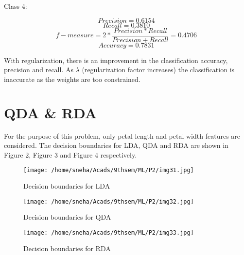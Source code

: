 \documentclass[12pt]{article}
\begin{document}
\begin{itemize}
{Class 4:

\begin{equation}
Precision = 0.6154
\end{equation}
\begin{equation}
Recall = 0.3810
\end{equation}
\begin{equation}
f-measure = 2*\frac{Precision*Recall}{Precision + Recall} = 0.4706
\end{equation}
\begin{equation}
Accuracy = 0.7831
\end{equation}


With regularization, there is an improvement in the classification accuracy, precision and recall. As $\lambda$ (regularization factor increases) the classification is inaccurate as the weights are too constrained.
}




\end{itemize}




\section{QDA \& RDA}

For the purpose of this problem, only petal length and petal width features are considered. The decision boundaries for LDA, QDA and RDA are shown in Figure 2, Figure 3 and Figure 4 respectively.


\begin{figure}


	\centering
		\texttt{[image: /home/sneha/Acads/9thsem/ML/P2/img31.jpg]}
	\caption{Decision boundaries for LDA}
	
\end{figure}


\begin{figure}
	\centering
		\texttt{[image: /home/sneha/Acads/9thsem/ML/P2/img32.jpg]}
	\caption{Decision boundaries for QDA}
	
\end{figure}

\begin{figure}
	\centering
		\texttt{[image: /home/sneha/Acads/9thsem/ML/P2/img33.jpg]}
	\caption{Decision boundaries for RDA}
	
\end{figure}
\end{document}

